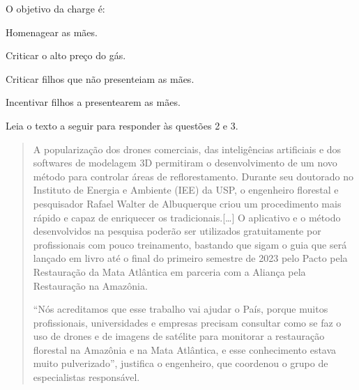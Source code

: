 \noindent O objetivo da charge é:

\begin{escolha}
\item Homenagear as mães.
\item Criticar o alto preço do gás.
\item Criticar filhos que não presenteiam as mães.
\item Incentivar filhos a presentearem as mães.
\end{escolha}



\noindent Leia o texto a seguir para responder às questões 2 e 3.

\begin{quote}
\noindent A popularização dos drones comerciais, das inteligências artificiais e
dos softwares de modelagem 3D permitiram o desenvolvimento de um novo
método para controlar áreas de reflorestamento. Durante seu doutorado no
Instituto de Energia e Ambiente (IEE) da USP, o engenheiro florestal e
pesquisador Rafael Walter de Albuquerque criou um procedimento mais
rápido e capaz de enriquecer os tradicionais.{[}\ldots{}{]} O aplicativo e o
método desenvolvidos na pesquisa poderão ser utilizados gratuitamente
por profissionais com pouco treinamento, bastando que sigam o guia que
será lançado em livro até o final do primeiro semestre de 2023 pelo
Pacto pela Restauração da Mata Atlântica em parceria com a Aliança pela
Restauração na Amazônia.

``Nós acreditamos que esse trabalho vai ajudar o
País, porque muitos profissionais, universidades e empresas precisam
consultar como se faz o uso de drones e de imagens de satélite para
monitorar a restauração florestal na Amazônia e na Mata Atlântica, e
esse conhecimento estava muito pulverizado'', justifica o engenheiro,
que coordenou o grupo de especialistas responsável.

\end{quote}

